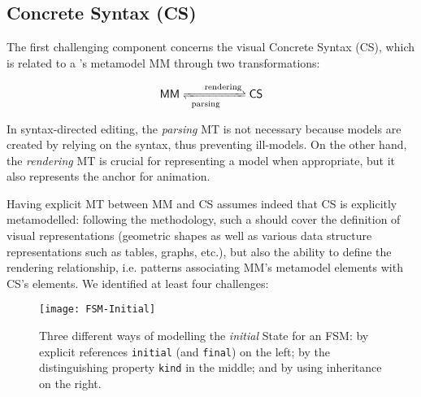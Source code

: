 \subsection{Concrete Syntax (CS)}
\label{sec:CS}

The first challenging component concerns the visual Concrete Syntax (CS), which
is related to a \DSML's metamodel \textsf{MM} through two transformations:

$$ \mathsf{MM} \xrightleftharpoons[\mathrm{parsing}\phantom{MM}]{\phantom{MM}\mathrm{rendering}} \mathsf{CS}$$

In syntax-directed editing, the \emph{parsing} MT is not necessary because models
are created by relying on the syntax, thus preventing ill-models. On the other hand,
the \emph{rendering} MT is crucial for representing a model when appropriate, but
it also represents the anchor for animation. 


Having explicit MT between \textsf{MM} and \textsf{CS} assumes indeed that 
\textsf{CS} is explicitly metamodelled: following the \MDE methodology, such
a \DSL should cover the definition of visual representations (geometric shapes as
well as various data structure representations such as tables, graphs, etc.),
but also the ability to define the rendering relationship, i.e. patterns associating
\textsf{MM}'s metamodel elements with \textsf{CS}'s elements.
We identified at least four challenges:

\begin{figure}[t]%
   \centering
   \texttt{[image: FSM-Initial]}%
   \caption{Three different ways of modelling the \emph{initial} \textsf{State} 
   for an \textsf{FSM}: by explicit references \texttt{initial} (and \texttt{final})
   on the left; by the distinguishing property \texttt{kind} in the middle; and
   by using inheritance on the right.}%
   \label{fig:FSM-Initial}%
\end{figure}

